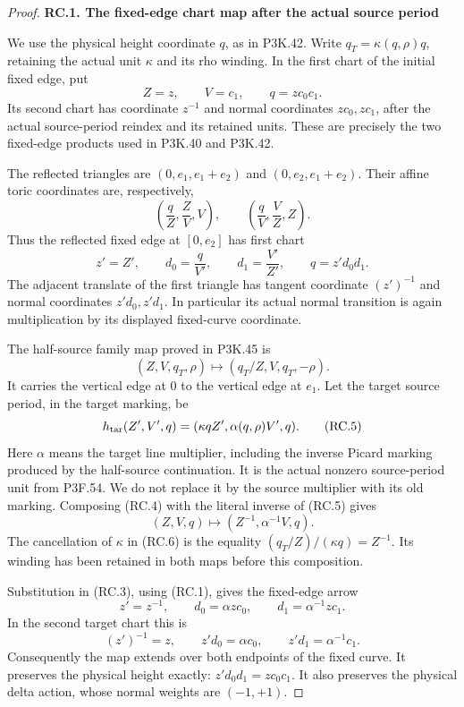 \begin{proof}
\par

\medskip\noindent\textbf{RC.1. The fixed-edge chart map after the actual source period}

\par\nobreak

We use the physical height coordinate \(q\), as in P3K.42. Write
\(q_T=\kappa(q,\rho)q\), retaining the actual unit \(\kappa\) and its
rho winding. In the first chart of the initial fixed edge, put
\[
 Z=z,\qquad V=c_1,\qquad q=z c_0c_1.                 \tag{RC.1}
\]
Its second chart has coordinate \(z^{-1}\) and normal coordinates
\(z c_0,z c_1\), after the actual source-period reindex and its
retained units. These are precisely the two fixed-edge products used
in P3K.40 and P3K.42.

The reflected triangles are
\((0,e_1,e_1+e_2)\) and \((0,e_2,e_1+e_2)\). Their affine toric
coordinates are, respectively,
\[
 \left(\frac qZ,\frac ZV,V\right),\qquad
 \left(\frac qV,\frac VZ,Z\right).                  \tag{RC.2}
\]
Thus the reflected fixed edge at \([0,e_2]\) has first chart
\[
 z'=Z',\qquad d_0=\frac q{V'},\qquad
 d_1=\frac{V'}{Z'},\qquad q=z'd_0d_1.              \tag{RC.3}
\]
The adjacent translate of the first triangle has tangent coordinate
\((z')^{-1}\) and normal coordinates \(z'd_0,z'd_1\).
In particular its actual normal transition is again multiplication
by its displayed fixed-curve coordinate.

The half-source family map proved in P3K.45 is
\[
 (Z,V,q_T,\rho)\longmapsto(q_T/Z,V,q_T,-\rho).
                                                               \tag{RC.4}
\]
It carries the vertical edge at \(0\) to the vertical edge at \(e_1\).
Let the target source period, in the target marking, be
\[
 h_{\rm tar}(Z',V',q)
       =(\kappa qZ',\alpha(q,\rho)V',q).             \tag{RC.5}
\]
Here \(\alpha\) means the target line multiplier, including the inverse
Picard marking produced by the half-source continuation. It is the
actual nonzero source-period unit from P3F.54. We do not replace it by
the source multiplier with its old marking. Composing (RC.4) with the
literal inverse of (RC.5) gives
\[
       (Z,V,q)\longmapsto(Z^{-1},\alpha^{-1}V,q).
                                                               \tag{RC.6}
\]
The cancellation of \(\kappa\) in (RC.6) is the equality
\((q_T/Z)/(\kappa q)=Z^{-1}\). Its winding has been retained in both
maps before this composition.

Substitution in (RC.3), using (RC.1), gives the fixed-edge arrow
\[
 z'=z^{-1},\qquad
 d_0=\alpha z c_0,\qquad d_1=\alpha^{-1}z c_1.
                                                               \tag{RC.7}
\]
In the second target chart this is
\[
 (z')^{-1}=z,\qquad z'd_0=\alpha c_0,
                   \qquad z'd_1=\alpha^{-1}c_1.       \tag{RC.8}
\]
Consequently the map extends over both endpoints of the fixed curve.
It preserves the physical height exactly:
\(z'd_0d_1=z c_0c_1\). It also preserves the physical delta action,
whose normal weights are \((-1,+1)\).


\end{proof}
